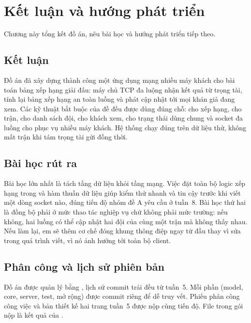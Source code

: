 \chapter{Kết luận và hướng phát triển}
\label{ch:ketluan}

\begin{muctieu}
Chương này tổng kết đồ án, nêu bài học và hướng phát triển tiếp theo.
\end{muctieu}

\section{Kết luận}

Đồ án đã xây dựng thành công một ứng dụng mạng nhiều máy khách cho bài toán
bảng xếp hạng giải đấu: máy chủ TCP đa luộng nhận kết quả từ trọng tài, tính lại
bảng xếp hạng an toàn luồng và phát cập nhật tới mọi khán giả đang xem. Các kỹ
thuật bắt buộc của đề đều được dùng đúng chỗ: 
cho xếp hạng,  cho trận,  cho danh sách đội,
 cho khách xem,  cho trạng thái
dùng chung và socket đa luồng cho phục vụ nhiều máy khách. Hệ thống chạy đúng
trên dữ liệu thử, không mất trận khi tám trọng tài gửi đồng thời.

\section{Bài học rút ra}

Bài học lớn nhất là tách tầng dữ liệu khỏi tầng mạng. Việc đặt toàn bộ logic
xếp hạng trong  và hàm  thuần dữ liệu giúp
kiểm thử nhanh và tin cậy trước khi viết một dòng socket nào, đúng tiến độ nhóm
đề A yêu cầu ở tuần~8. Bài học thứ hai là đồng bộ phải ở mức thao tác nghiệp vụ
chứ không phải mức trường: nếu không, hai luồng có thể cập nhật hai đội của
cùng một trận mà không thấy nhau. Nếu làm lại, em sẽ thêm cơ chế đóng khung
thông điệp ngay từ đầu thay vì sửa trong quá trình viết, vì nó ảnh hưởng tới
toàn bộ client.

\section{Phân công và lịch sử phiên bản}

Đồ án được quản lý bằng , lịch sử commit trải đều từ tuần~5. Mỗi phần
(model, core, server, test, mở rộng) được commit riêng để dễ truy vết. Phiếu
phân công công việc và bản thiết kế hai trang tuần~5 được nộp cùng tiến độ. File
 trong gói nộp là kết quả của .

